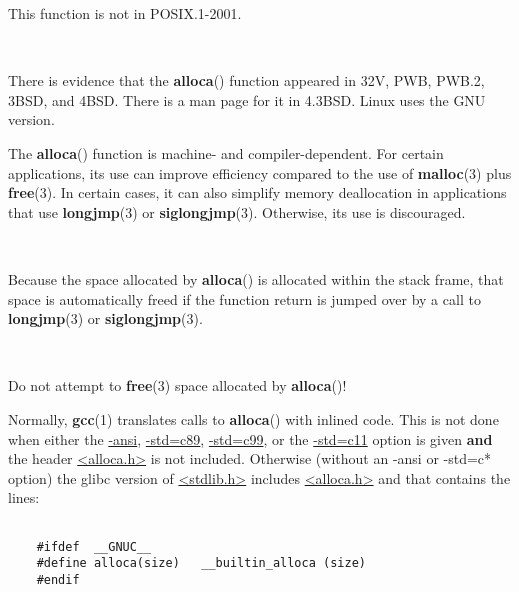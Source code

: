 \documentclass[]{article}
\let\realtextbf=\textbf
\renewcommand{\textbf}[1]{\textcolor{boldcolor}{\realtextbf{#1}}}
\renewcommand{\emph}[1]{\underline{#1}}
\begin{document}
This function is not in POSIX.1-2001.

~

There is evidence that the \textbf{alloca}() function appeared in 32V,
PWB, PWB.2, 3BSD, and 4BSD. There is a man page for it in 4.3BSD. Linux
uses the GNU version.


The \textbf{alloca}() function is machine- and compiler-dependent. For
certain applications, its use can improve efficiency compared to the use
of \textbf{malloc}(3) plus \textbf{free}(3). In certain cases, it can
also simplify memory deallocation in applications that use
\textbf{longjmp}(3) or \textbf{siglongjmp}(3). Otherwise, its use is
discouraged.

~

Because the space allocated by \textbf{alloca}() is allocated within the
stack frame, that space is automatically freed if the function return is
jumped over by a call to \textbf{longjmp}(3) or \textbf{siglongjmp}(3).

~

Do not attempt to \textbf{free}(3) space allocated by \textbf{alloca}()!


Normally, \textbf{gcc}(1) translates calls to \textbf{alloca}() with
inlined code. This is not done when either the \emph{-ansi},
\emph{-std=c89}, \emph{-std=c99}, or the \emph{-std=c11} option is given
\textbf{and} the header \emph{\textless{}alloca.h\textgreater{}} is not
included. Otherwise (without an -ansi or -std=c* option) the glibc
version of \emph{\textless{}stdlib.h\textgreater{}} includes
\emph{\textless{}alloca.h\textgreater{}} and that contains the lines:

\begin{verbatim}

    #ifdef  __GNUC__
    #define alloca(size)   __builtin_alloca (size)
    #endif
\end{verbatim}
\end{document}
